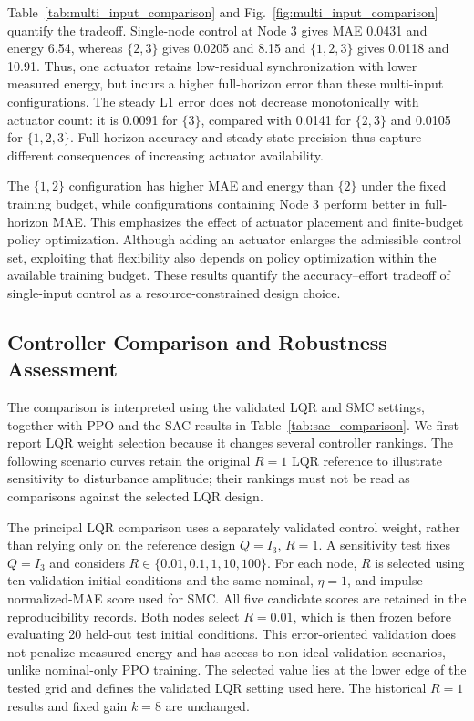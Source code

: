\documentclass[a4paper,fleqn]{cas-sc}
\theoremstyle{plain}
\theoremstyle{definition}
\begin{document}
Table~\ref{tab:multi_input_comparison} and Fig.~\ref{fig:multi_input_comparison} quantify the tradeoff. Single-node control at Node 3 gives MAE 0.0431 and energy 6.54, whereas $\{2,3\}$ gives 0.0205 and 8.15 and $\{1,2,3\}$ gives 0.0118 and 10.91. Thus, one actuator retains low-residual synchronization with lower measured energy, but incurs a higher full-horizon error than these multi-input configurations. The steady L1 error does not decrease monotonically with actuator count: it is 0.0091 for $\{3\}$, compared with 0.0141 for $\{2,3\}$ and 0.0105 for $\{1,2,3\}$. Full-horizon accuracy and steady-state precision thus capture different consequences of increasing actuator availability.

The $\{1,2\}$ configuration has higher MAE and energy than $\{2\}$ under the fixed training budget, while configurations containing Node 3 perform better in full-horizon MAE. This emphasizes the effect of actuator placement and finite-budget policy optimization. Although adding an actuator enlarges the admissible control set, exploiting that flexibility also depends on policy optimization within the available training budget. These results quantify the accuracy--effort tradeoff of single-input control as a resource-constrained design choice.

\subsection{Controller Comparison and Robustness Assessment}
\label{subsec:robustness_tests}

The comparison is interpreted using the validated LQR and SMC settings, together with PPO and the SAC results in Table~\ref{tab:sac_comparison}. We first report LQR weight selection because it changes several controller rankings. The following scenario curves retain the original $R=1$ LQR reference to illustrate sensitivity to disturbance amplitude; their rankings must not be read as comparisons against the selected LQR design.


The principal LQR comparison uses a separately validated control weight, rather than relying only on the reference design $Q=I_3$, $R=1$. A sensitivity test fixes $Q=I_3$ and considers $R\in\{0.01,0.1,1,10,100\}$. For each node, $R$ is selected using ten validation initial conditions and the same nominal, $\eta=1$, and impulse normalized-MAE score used for SMC. All five candidate scores are retained in the reproducibility records. Both nodes select $R=0.01$, which is then frozen before evaluating 20 held-out test initial conditions. This error-oriented validation does not penalize measured energy and has access to non-ideal validation scenarios, unlike nominal-only PPO training. The selected value lies at the lower edge of the tested grid and defines the validated LQR setting used here. The historical $R=1$ results and fixed gain $k=8$ are unchanged.
\end{document}
